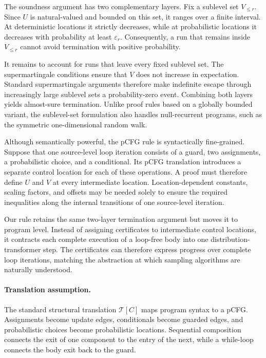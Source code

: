 The soundness argument has two complementary layers. Fix a sublevel
set $V_{\leq r}$. Since $U$ is natural-valued and bounded on this set,
it ranges over a finite interval. At deterministic locations it
strictly decreases, while at probabilistic locations it decreases
with probability at least $\varepsilon_r$. Consequently, a run that
remains inside $V_{\leq r}$ cannot avoid termination with positive
probability.

It remains to account for runs that leave every fixed sublevel set.
The supermartingale conditions ensure that $V$ does not increase in
expectation. Standard supermartingale arguments therefore make
indefinite escape through increasingly large sublevel sets a
probability-zero event. Combining both layers yields almost-sure
termination. Unlike proof rules based on a globally bounded variant,
the sublevel-set formulation also handles null-recurrent programs,
such as the symmetric one-dimensional random walk.

Although semantically powerful, the pCFG rule is syntactically
fine-grained. Suppose that one source-level loop iteration consists
of a guard, two assignments, a probabilistic choice, and a
conditional. Its pCFG translation introduces a separate control
location for each of these operations. A proof must therefore define
$U$ and $V$ at every intermediate location. Location-dependent
constants, scaling factors, and offsets may be needed solely to
ensure the required inequalities along the internal transitions of
one source-level iteration.

Our rule retains the same two-layer termination argument but moves it
to program level. Instead of assigning certificates to intermediate
control locations, it contracts each complete execution of a
loop-free body into one distribution-transformer step. The
certificates can therefore express progress over complete loop
iterations, matching the abstraction at which sampling algorithms
are naturally understood.

\paragraph{Translation assumption.}
The standard structural translation $\mathcal{T}[C]$ maps program
syntax to a pCFG. Assignments become update edges, conditionals become
guarded edges, and probabilistic choices become probabilistic
locations. Sequential composition connects the exit of one component
to the entry of the next, while a while-loop connects the body exit
back to the guard.

